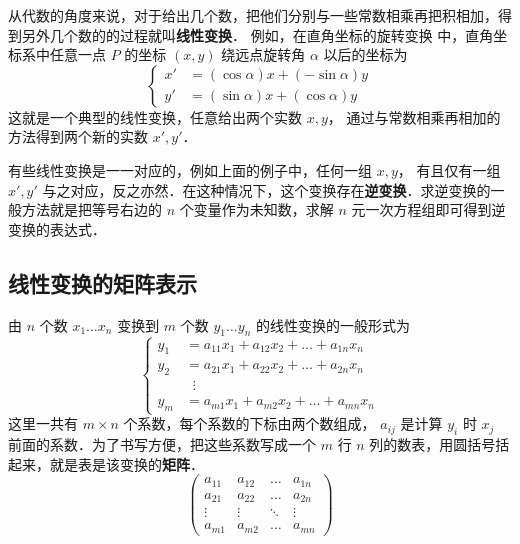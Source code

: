 

从代数的角度来说，对于给出几个数，把他们分别与一些常数相乘再把积相加，得到另外几个数的的过程就叫\textbf{线性变换}． 例如，在直角坐标的旋转变换%
中，直角坐标系中任意一点 $P$ 的坐标 $( {x,y} )$ 绕远点旋转角 $\alpha $ 以后的坐标为
\begin{equation}\label{LTrans_eq1}
\left\{\begin{aligned}
x' &= \left( {\cos \alpha } \right)x + \left( { - \sin \alpha } \right)y\\
y' &= \left( {\sin \alpha } \right)x + \left( {\cos \alpha } \right)y
\end{aligned}\right.\end{equation}
这就是一个典型的线性变换，任意给出两个实数 $x,y$， 通过与常数相乘再相加的方法得到两个新的实数  $x',y'$． 

有些线性变换是一一对应的，例如上面的例子中，任何一组 $x,y$， 有且仅有一组 $x',y'$ 与之对应，反之亦然．在这种情况下，这个变换存在\textbf{逆变换}．求逆变换的一般方法就是把等号右边的 $n$ 个变量作为未知数，求解 $n$ 元一次方程组即可得到逆变换的表达式．


\subsection{线性变换的矩阵表示}

由 $n$ 个数 ${x_1} \ldots {x_n}$ 变换到 $m$ 个数 ${y_1} \ldots {y_n}$ 的线性变换的一般形式为
\begin{equation}
\left\{ \begin{aligned}
{y_1} &= {a_{11}}{x_1} + {a_{12}}{x_2} + \ldots + {a_{1n}}{x_n}\\
{y_2} &= {a_{21}}{x_1} + {a_{22}}{x_2} + \ldots + {a_{2n}}{x_n}\\
&\;\;\vdots \\
{y_m} &= {a_{m1}}{x_1} + {a_{m2}}{x_2} + \ldots + {a_{mn}}{x_n}
\end{aligned} \right. 
\end{equation} 
这里一共有 $m \times n$ 个系数，每个系数的下标由两个数组成， ${a_{ij}}$ 是计算 ${y_i}$ 时 ${x_j}$ 前面的系数．为了书写方便，把这些系数写成一个 $m$ 行 $n$ 列的数表，用圆括号括起来，就是表是该变换的\textbf{矩阵}．
\begin{equation}
\left( {\begin{array}{*{20}{c}}
{{a_{11}}}&{{a_{12}}}& \ldots &{{a_{1n}}}\\
{{a_{21}}}&{{a_{22}}}& \ldots &{{a_{2n}}}\\
 \vdots & \vdots & \ddots & \vdots \\
{{a_{m1}}}&{{a_{m2}}}& \ldots &{{a_{mn}}}
\end{array}} \right)
\end{equation} 
